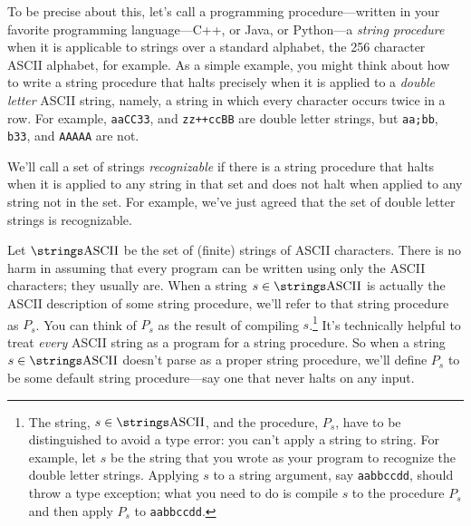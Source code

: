 To be precise about this, let's call a programming procedure---written
in your favorite programming language---C++, or Java, or Python---a
\emph{string procedure} when it is applicable to strings over a
standard alphabet, the 256 character ASCII alphabet, for example.
\iffalse When a string procedure applied to an ASCII string halts,
we'll say the procedure halts on the string.  If it runs forever, then
we'll say does not halt on the string.\fi As a simple example, you
might think about how to write a string procedure that halts precisely
when it is applied to a \emph{double letter} ASCII string, namely, a
string in which every character occurs twice in a row.  For example,
\texttt{aaCC33}, and \texttt{zz++ccBB} are double letter strings, but
\texttt{aa;bb}, \texttt{b33}, and \texttt{AAAAA} are not.

We'll call a set of strings \emph{recognizable} if there is a string
procedure that halts when it is applied to any string in that set and
does not halt when applied to any string not in the set.  For example,
we've just agreed that the set of double letter strings is recognizable.

Let $\asciistr$ be the set of (finite) strings of ASCII characters.
There is no harm in assuming that every program can be written using
only the ASCII characters; they usually are.  When a string $s
\in \asciistr$ is actually the ASCII description of some string
procedure, we'll refer to that string procedure as $P_s$.  You can
think of $P_s$ as the result of compiling $s$.\footnote{The string, $s
  \in \asciistr$, and the procedure, $P_s$, have to be distinguished
  to avoid a type error: you can't apply a string to string.  For
  example, let $s$ be the string that you wrote as your program to
  recognize the double letter strings.  Applying $s$ to a string
  argument, say \texttt{aabbccdd}, should throw a type exception; what
  you need to do is compile $s$ to the procedure $P_s$ and then apply
  $P_s$ to \texttt{aabbccdd}.  \iffalse This application should result
  in a halting computation, since \texttt{aabbccdd} is a double letter
  string.\fi } It's technically helpful to treat \emph{every} ASCII
string as a program for a string procedure.  So when a string $s \in
\asciistr$ doesn't parse as a proper string procedure, we'll define
$P_s$ to be some default string procedure---say one that never halts
on any input.  \iffalse So if $s$ is an ill-formed string, $P_S$ will
be a recognizer for the empty set of strings.  \fi

